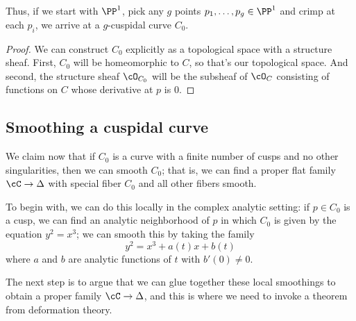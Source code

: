 Thus, if we start with $\PP^1$, pick any $g$ points $p_1,\dots, p_g \in \PP^1$ and crimp at each $p_i$, we arrive at a $g$-cuspidal curve $C_0$.

\begin{proof}
We can construct $C_0$ explicitly as a topological space with a structure sheaf.
First, $C_0$ will be homeomorphic to $C$, so that's our topological space. And second, the structure sheaf $\cO_{C_0}$ will be the subsheaf of $\cO_C$ consisting of functions on $C$ whose derivative at $p$ is 0.
\end{proof}

\subsection{Smoothing a cuspidal curve}  We claim now that if $C_0$ is a curve with a finite number of cusps and no other singularities, then we can smooth $C_0$; that is, we can find a proper flat family $\cC \to \Delta$ with special fiber $C_0$ and all other fibers smooth. 

To begin with, we can do this locally in the complex analytic setting: if $p \in C_0$ is a cusp, we can find an analytic neighborhood of $p$ in which $C_0$ is given by the equation $y^2 = x^3$; we can smooth this by taking the family
$$
y^2 = x^3 + a(t)x + b(t)
$$
where $a$ and $b$ are analytic functions of $t$ with $b'(0) \neq 0$.

The next step is to argue that we can glue together these local smoothings to obtain a proper family $\cC \to \Delta$, and this is where we need to invoke a theorem from deformation theory. 


